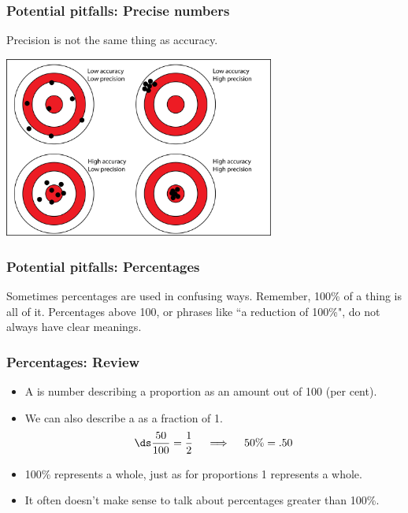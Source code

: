 \documentclass[xcolor=table, handout]{beamer}
\begin{document}
\begin{frame}
\frametitle{Potential pitfalls: Precise numbers}

\begin{block}{}
Precision is not the same thing as accuracy.
\end{block}

\begin{center}
\includegraphics[width=3.5in]{../images/precision_accuracy}
\end{center}
\end{frame}

\begin{frame}
\frametitle{Potential pitfalls: Percentages}

\begin{block}{}
Sometimes percentages are used in confusing ways. Remember, 100\% of a thing is all of it. Percentages above 100, or phrases like ``a reduction of 100\%", do not always have clear meanings. 
\end{block}


\end{frame}

\begin{frame}
\frametitle{Percentages: Review}

\begin{block}{}
\begin{itemize}
\item A  is number describing a proportion as an amount out of 100 (per cent).
\pause
\item We can also describe a  as a fraction of 1.
\[\ds \frac {50}{100} = \frac 1 2 \quad \implies \quad 50\% = .50\]
\pause
\item 100\% represents a whole, just as for proportions 1 represents a whole.
\pause
\item It often doesn't make sense to talk about percentages greater than 100\%.
\end{itemize}
\end{block}
\end{frame}
\end{document}
